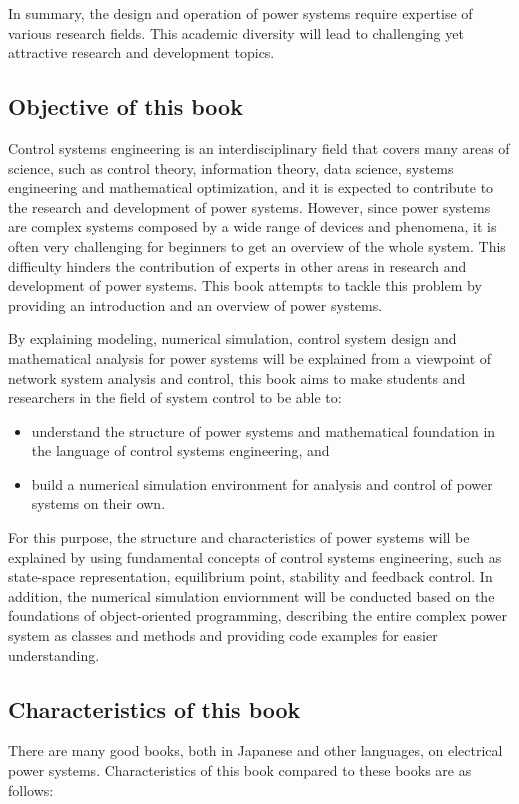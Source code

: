 \documentclass[graybox, envcountchap]{svmult}
\begin{document}
In summary, the design and operation of power systems require expertise of
various research fields. This academic diversity will lead to challenging yet
attractive research and development topics.


\subsection{Objective of this book}

Control systems engineering is an interdisciplinary field that covers many areas
of science, such as control theory, information theory, data science, systems
engineering and mathematical optimization, and it is expected to contribute to
the research and development of power systems. However, since power systems are
complex systems composed by a wide range of devices and phenomena, it is often
very challenging for beginners to get an overview of the whole system. This
difficulty hinders the contribution of experts in other areas in research and
development of power systems. This book attempts to tackle this problem by
providing an introduction and an overview of power systems.

By explaining modeling, numerical simulation, control system design and
mathematical analysis for power systems will be explained from a viewpoint of
network system analysis and control, this book aims to make students and
researchers in the field of system control to be able to:

\begin{itemize}
	\item understand the structure of power systems and mathematical foundation
	in the language of control systems engineering, and
	\item build a numerical simulation environment for analysis and control of
	power systems on their own. 
\end{itemize}

For this purpose, the structure and characteristics of power systems will be
explained by using fundamental concepts of control systems engineering, such as
state-space representation, equilibrium point, stability and feedback control.
In addition, the numerical simulation enviornment will be conducted based on the
foundations of object-oriented programming, describing the entire complex power
system as classes and methods and providing code examples for easier
understanding.

\subsection{Characteristics of this book}
There are many good books, both in Japanese and other languages, on electrical
power systems. Characteristics of this book compared to these books are as
follows:
\end{document}
